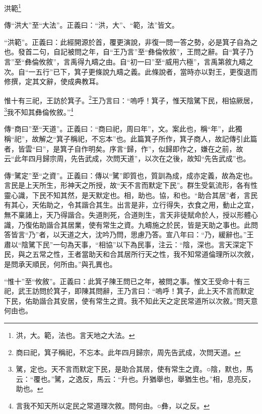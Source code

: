 洪範\footnote{洪，大。範，法也。言天地之大法。}


{\noindent\zhuan{}\fzbyks 傳“洪大”至“大法”。正義曰：“洪，大”、“範，法”皆文。 \par}

{\noindent\shu{}\fzkt “洪範”。正義曰：此經開源於首，覆更演說，非復一問一答之勢，必是箕子自為之也。發首二句，自記被問之年，自“王乃言”至“彝倫攸敘”，王問之辭。自“箕子乃言”至“彝倫攸敘”，言禹得九疇之由。自“初一曰”至“威用六極”，言禹第敘九疇之次。自“一五行”已下，箕子更條說九疇之義。此條說者，當時亦以對王，更復退而修撰，定其文辭，使成典教耳。 \par}

惟十有三祀，王訪於箕子。\footnote{商曰祀，箕子稱祀，不忘本。此年四月歸宗，周先告武成，次問天道。}王乃言曰：“嗚呼！箕子，惟天陰騭下民，相協厥居，\footnote{騭，定也。天不言而默定下民，是助合其居，使有常生之資。○陰，默也，馬云：“覆也。”騭，之逸反，馬云：“升也。升猶舉也，舉猶生也。”相，息亮反，助也。}我不知其彝倫攸敘。”\footnote{言我不知天所以定民之常道理次敘。問何由。○彝，以之反。}


{\noindent\zhuan{}\fzbyks 傳“商曰”至“天道”。正義曰：“商曰祀，周曰年”，文。案此也，稱“年”，此獨稱“祀”，故解之“箕子稱祀，不忘本”也。此篇箕子所作，箕子商人，故記傳引此篇者，皆雲“曰”，是箕子自作明矣。序言“歸，作”，似歸即作之，嫌在之前，故云“此年四月歸宗周，先告武成，次問天道”，以次在之後，故知“先告武成”也。 \par}

{\noindent\zhuan{}\fzbyks 傳“騭定”至“之資”。正義曰：傳以“騭”即質也，質訓為成，成亦定義，故為定也。言民是上天所生，形神天之所授，故“天不言而默定下民”。群生受氣流形，各有性靈心識，下民不知其然，是天默定也。相，助也。協，和也。“助合其居”者，言民有其心，天佑助之，令其諧合其生。出言是非，立行得失，衣食之用，動止之宜，無不稟諸上，天乃得諧合。失道則死，合道則生，言天非徒賦命於人，授以形體心識，乃復佑助諧合其居業，使有常生之資。九疇施之於民，皆是天助之事也。此問答皆言“乃”者，以天道之大，沈吟乃問，思慮乃答。宣八年曰：“乃，緩辭也。”王肅以“陰騭下民”一句為天事，“相協”以下為民事，注云：“陰，深也。言天深定下民，與之五常之性，王者當助天和合其居所行天之性，我不知常道倫理所以次敘，是問承天順民，何所由。”與孔異也。 \par}

{\noindent\shu{}\fzkt “惟十”至“攸敘”。正義曰：此箕子陳王問已之年，被問之事。惟文王受命十有三祀，武王訪問於箕子，即陳其問辭，王乃言曰：“嗚呼！箕子，此上天不言而默定下民，佑助諧合其安居，使有常生之資。我不知此天之定民常道所以次敘。”問天意何由也。 \par}

